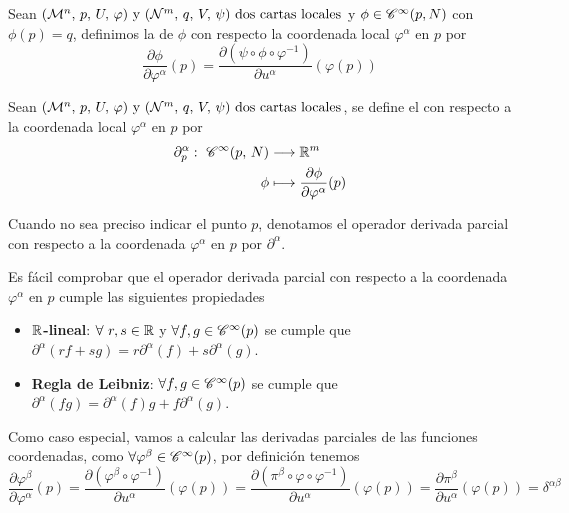 \begin{definition}
  Sean $(\mathcal{M}^n,\thinspace p,\thinspace U,\thinspace\varphi)\textmd{ y } (\mathcal{N}^m,\thinspace q,\thinspace V,\thinspace\psi)\textmd{ dos cartas locales}$ y $\phi\in\mathscr{C}^\infty(p, N)$ con $\phi(p)=q$, definimos la
   de $\phi$ con respecto la coordenada local
  $\varphi^\alpha$ en $p$ por
  \begin{equation*}
    \label{eq:parcial-funcion-punto}
    \frac{\partial\phi}{\partial \varphi^\alpha}(p)=\frac{\partial(\psi\circ\phi\circ\varphi^{-1})}{\partial
    u^\alpha}(\varphi(p))
  \end{equation*}
\end{definition}

\begin{definition}
  Sean $(\mathcal{M}^n,\thinspace p,\thinspace U,\thinspace\varphi)\textmd{ y } (\mathcal{N}^m,\thinspace q,\thinspace V,\thinspace\psi)\textmd{ dos cartas locales}$, se define el
   con
  respecto a la coordenada local $\varphi^\alpha$ en $p$ por
  \begin{equation*}
    \begin{alignedat}{1}
      \partial^\alpha_p:\ \mathscr{C}^\infty(p,\thinspace N) & \longrightarrow \mathbb{R}^m \\ \phi & \longmapsto \frac{\partial
      \phi}{\partial\varphi^\alpha}(p)
    \end{alignedat}
  \end{equation*}
\end{definition}

\begin{notation}
Cuando no sea preciso indicar el punto $p$, denotamos el operador derivada parcial con respecto a la coordenada
$\varphi^\alpha$ en $p$ por $\partial^\alpha$.
\end{notation}

Es fácil comprobar que el operador derivada parcial con respecto a la coordenada $\varphi^\alpha$ en $p$ cumple las
siguientes propiedades
\begin{itemize}\label{propiedad-derivada-parcial}
  \item \textbf{$\mathbb{R}$-lineal}: $\forall\ r,s\in\mathbb{R}$ y $\forall f,g\in\mathscr{C}^\infty(p)$ se cumple que $\partial^\alpha(rf+sg)
  =r\partial^\alpha(f)+s\partial^\alpha(g)$.
  \item \textbf{Regla de Leibniz}: $\forall f,g\in\mathscr{C}^\infty(p)$ se cumple que $\partial^\alpha(fg)=\partial^\alpha
  (f)g+f\partial^\alpha(g)$.
\end{itemize}

Como caso especial, vamos a calcular las derivadas parciales de las funciones coordenadas, como
$\forall\varphi^\beta\in\mathscr{C}^\infty(p)$, por definición tenemos
\begin{equation}\label{eq:derivada-parcial-coordenada-local}
  \frac{\partial\varphi^\beta}{\partial\varphi^\alpha}(p)=\frac{\partial (\varphi^\beta\circ\varphi^{-1})
  }{\partial u^\alpha}(\varphi(p))=\frac{\partial (\pi^\beta\circ\varphi\circ\varphi^{-1})
  }{\partial u^\alpha}(\varphi(p))=\frac{\partial\pi^\beta}{\partial u^\alpha}(\varphi(p))=\delta^{\alpha\beta}
\end{equation}


